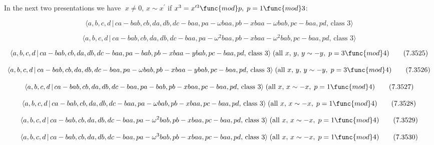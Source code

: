 \documentclass[10pt]{article}
\begin{document}
In the next two presentations we have $\;x\neq 0,\,x\sim x^{\prime }$ if $%
x^{3}=x^{\prime 3}\func{mod}p,\;p=1\func{mod}3$:

\begin{equation}
\langle a,b,c,d\,|\,ca-bab,cb,da,db,dc-baa,pa-\omega baa,pb-xbaa-\omega
bab,pc-baa,pd,\,\text{class }3\rangle  \tag{7.3523}
\end{equation}

\begin{equation}
\langle a,b,c,d\,|\,ca-bab,cb,da,db,dc-baa,pa-\omega ^{2}baa,pb-xbaa-\omega
^{2}bab,pc-baa,pd,\,\text{class }3\rangle  \tag{7.3524}
\end{equation}

\begin{equation}
\langle a,b,c,d\,|\,ca-bab,cb,da,db,dc-baa,pa-bab,pb-xbaa-ybab,pc-baa,pd,\,%
\text{class }3\rangle \;(\text{all }x,\,y,\,y\sim -y,\;p=3\func{mod}4) 
\tag{7.3525}
\end{equation}

\begin{equation}
\langle a,b,c,d\,|\,ca-bab,cb,da,db,dc-baa,pa-\omega
bab,pb-xbaa-ybab,pc-baa,pd,\,\text{class }3\rangle \;(\text{all }%
x,\,y,\,y\sim -y,\;p=3\func{mod}4)  \tag{7.3526}
\end{equation}

\begin{equation}
\langle a,b,c,d\,|\,ca-bab,cb,da,db,dc-baa,pa-bab,pb-xbaa,pc-baa,pd,\,\text{%
class }3\rangle \;(\text{all }x,\,x\sim -x,\;p=1\func{mod}4)  \tag{7.3527}
\end{equation}

\begin{equation}
\langle a,b,c,d\,|\,ca-bab,cb,da,db,dc-baa,pa-\omega bab,pb-xbaa,pc-baa,pd,\,%
\text{class }3\rangle \;(\text{all }x,\,x\sim -x,\;p=1\func{mod}4) 
\tag{7.3528}
\end{equation}

\begin{equation}
\langle a,b,c,d\,|\,ca-bab,cb,da,db,dc-baa,pa-\omega
^{2}bab,pb-xbaa,pc-baa,pd,\,\text{class }3\rangle \;(\text{all }x,\,x\sim
-x,\;p=1\func{mod}4)  \tag{7.3529}
\end{equation}

\begin{equation}
\langle a,b,c,d\,|\,ca-bab,cb,da,db,dc-baa,pa-\omega
^{3}bab,pb-xbaa,pc-baa,pd,\,\text{class }3\rangle \;(\text{all }x,\,x\sim
-x,\;p=1\func{mod}4)  \tag{7.3530}
\end{equation}
\end{document}
